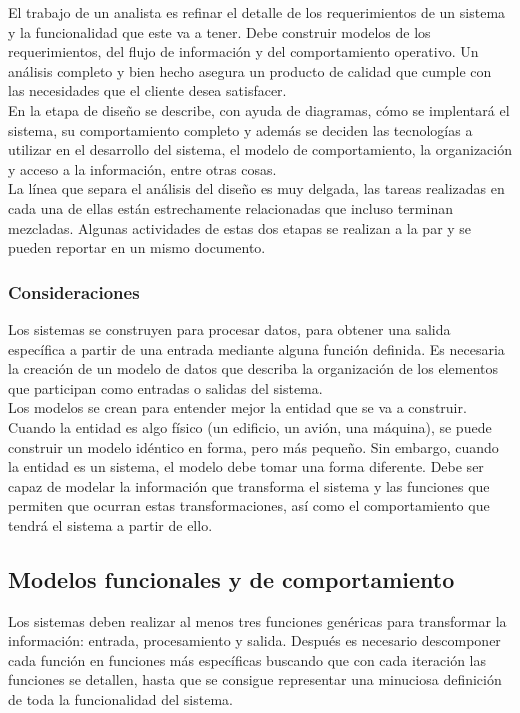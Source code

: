 El trabajo de un analista es refinar el detalle de los requerimientos de un sistema y la funcionalidad que este va a tener. Debe construir modelos de los requerimientos, del flujo de información y del comportamiento operativo. Un análisis completo
y bien hecho asegura un producto de calidad que cumple con las necesidades que el cliente desea satisfacer. \\

En la etapa de diseño se describe, con ayuda de diagramas, cómo se implentará el sistema, su comportamiento completo y además se deciden
las tecnologías a utilizar en el desarrollo del sistema, el modelo de comportamiento, la organización y acceso a la información, entre otras cosas.\\

La línea que separa el análisis del diseño es muy delgada, las tareas realizadas en cada una de ellas están estrechamente relacionadas que
incluso terminan mezcladas. Algunas actividades de estas dos etapas se realizan a la par y se pueden reportar en un mismo documento.\\

\subsubsection{Consideraciones}

Los sistemas se construyen para procesar datos, para obtener una salida específica a partir de una entrada mediante alguna función definida. 
Es necesaria la creación de un modelo de datos que describa la organización de los elementos que participan como entradas o salidas del sistema.\\

Los modelos se crean para entender mejor la entidad que se va a construir. Cuando la entidad es algo físico (un edificio, un avión, una máquina), 
se puede construir un modelo idéntico en forma, pero más pequeño. Sin embargo, cuando la entidad es un sistema,
el modelo debe tomar una forma diferente. Debe ser capaz de modelar la información que transforma el sistema y las funciones que 
permiten que ocurran estas transformaciones, así como el comportamiento que tendrá el sistema a partir de ello.\\

\subsection{Modelos funcionales y de comportamiento}
Los sistemas deben realizar al menos tres funciones genéricas para transformar la información: entrada, procesamiento y salida. 
Después es necesario descomponer cada función en funciones más específicas buscando que con cada iteración 
las funciones se detallen, hasta que se consigue representar una minuciosa definición de toda la funcionalidad del sistema.\\

